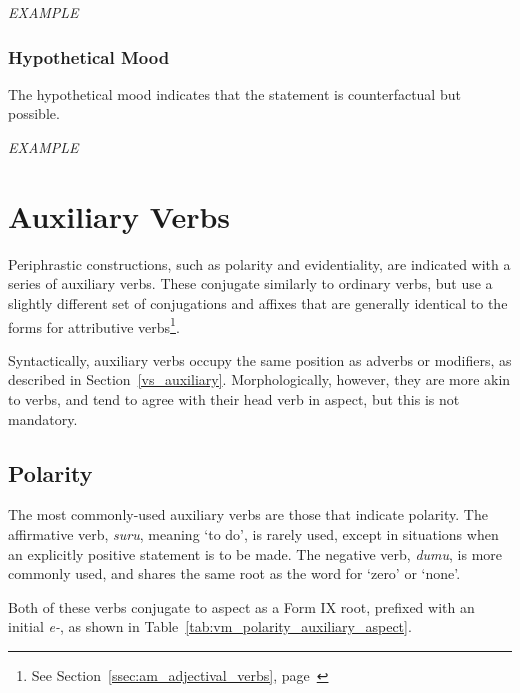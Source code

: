 \documentclass[grammar]{subfiles}
\begin{document}
  \begin{exe}
    \ex \emph{EXAMPLE}
  \end{exe}

  \subsubsection{Hypothetical Mood}
  \label{sssec:vm_hypothetical}

  The hypothetical mood indicates that the statement is counterfactual but possible.

  \begin{exe}
    \ex \emph{EXAMPLE}
  \end{exe}


  \section{Auxiliary Verbs}
  \label{sec:vm_auxiliary}

  Periphrastic constructions, such as polarity and evidentiality, are indicated with a series of auxiliary verbs. These conjugate similarly to ordinary verbs, but use a slightly different set of conjugations and affixes that are generally identical to the forms for attributive verbs\footnote{See Section~\ref{ssec:am_adjectival_verbs}, page~\pageref{ssec:am_adjectival_verbs}}. 

  Syntactically, auxiliary verbs occupy the same position as adverbs or modifiers, as described in Section~\ref{vs_auxiliary}. Morphologically, however, they are more akin to verbs, and tend to agree with their head verb in aspect, but this is not mandatory.

  \subsection{Polarity}
  \label{ssec:vm_polarity}

  The most commonly-used auxiliary verbs are those that indicate polarity. The affirmative verb, \textit{suru}, meaning ‘to do’, is rarely used, except in situations when an explicitly positive statement is to be made. The negative verb, \textit{dumu}, is more commonly used, and shares the same root as the word for ‘zero’ or ‘none’.

  Both of these verbs conjugate to aspect as a Form IX root, prefixed with an initial \textit{e-}, as shown in Table~\ref{tab:vm_polarity_auxiliary_aspect}.
\end{document}
